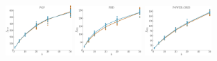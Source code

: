 \documentclass[a4paper]{report}
\newcommand{\wratio}{0.19}
\begin{document}
\includegraphics[width=\wratio\textwidth]{maxcut/PGP/fs_pgp}\hfill
\includegraphics[width=\wratio\textwidth]{maxcut/PHD/fs_phd}\hfill
\includegraphics[width=\wratio\textwidth]{maxcut/POWER_GRID/fs_power_grid}\hfill
\end{document}
